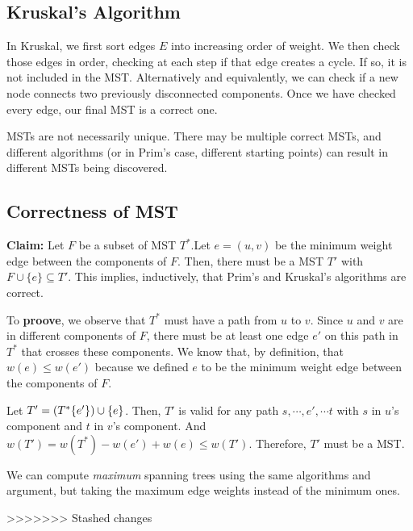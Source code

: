 \documentclass[titlepage, 12pt, leqno]{article}
\begin{document}
\subsection{Kruskal's Algorithm}
In Kruskal, we first sort edges $E$ into increasing order of weight. We then
check those edges in order, checking at each step if that edge creates a cycle.
If so, it is not included in the MST. Alternatively and equivalently, we can 
check if a new node connects two previously disconnected components. Once we
have checked every edge, our final MST is a correct one.

\begin{note}
    MSTs are not necessarily unique. There may be multiple correct MSTs, and
    different algorithms (or in Prim's case, different starting points) can
    result in different MSTs being discovered.
\end{note}

\subsection{Correctness of MST}
\textbf{Claim:} Let $F$ be a subset of MST $T^{*}$.Let $e = (u,v)$ be the
minimum weight edge between the components of $F$. Then, there must be a MST
$T'$ with $F \cup \{e\} \subseteq T'$. This implies, inductively, that Prim's
and Kruskal's algorithms are correct.

To \textbf{proove}, we observe that $T^{*}$ must have a path from $u$ to $v$.
Since $u$ and $v$ are in different components of $F$, there must be at least
one edge $e'$ on this path in $T^{*}$ that crosses these components. We know
that, by definition, that $w(e) \le w(e')$ because we defined $e$ to be the
minimum weight edge between the components of $F$.

Let $T' = (T^{*}\\ \{e'\}) \cup \{e\}$. Then, $T'$ is valid for any path
$s, \cdots , e', \cdots t$ with $s$ in $u$'s component and $t$ in $v$'s
component. And $w(T') = w(T^{*}) - w(e') + w(e) \le w(T')$. Therefore, $T'$
must be a MST.

\begin{note}
    We can compute \textit{maximum} spanning trees using the same algorithms
    and argument, but taking the maximum edge weights instead of the minimum
    ones.
\end{note}

>>>>>>> Stashed changes
\end{document}
